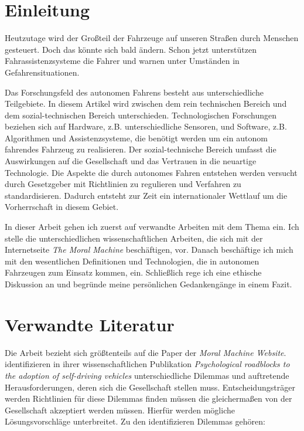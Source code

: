 \section{Einleitung}

Heutzutage wird der Großteil der Fahrzeuge auf unseren Straßen durch Menschen gesteuert. Doch das könnte sich bald ändern. Schon jetzt unterstützen Fahrassistenzsysteme die Fahrer und warnen unter Umständen in Gefahrensituationen.

Das Forschungsfeld des autonomen Fahrens besteht aus unterschiedliche Teilgebiete. In diesem Artikel wird  zwischen dem rein technischen Bereich und dem sozial-technischen Bereich unterschieden. Technologischen Forschungen beziehen sich auf Hardware, z.B. unterschiedliche Sensoren, und Software, z.B. Algorithmen und Assistenzsysteme, die benötigt werden um ein autonom fahrendes Fahrzeug zu realisieren. Der sozial-technische Bereich umfasst die Auswirkungen auf die Gesellschaft und das Vertrauen in die neuartige Technologie. Die Aspekte die durch autonomes Fahren entstehen werden versucht durch Gesetzgeber mit Richtlinien zu regulieren und Verfahren zu standardisieren. Dadurch entsteht zur Zeit ein internationaler Wettlauf um die Vorherrschaft in diesem Gebiet.

In dieser Arbeit gehen ich zuerst auf verwandte Arbeiten mit dem Thema ein. Ich stelle die unterschiedlichen wissenschaftlichen Arbeiten, die sich mit der Internetseite \textit{The Moral Machine} beschäftigen, vor. Danach beschäftige ich mich mit den wesentlichen Definitionen und Technologien, die in autonomen Fahrzeugen zum Einsatz kommen, ein. Schließlich rege ich eine ethische Diskussion an und begründe meine persönlichen Gedankengänge in einem Fazit.

\section{Verwandte Literatur}
Die Arbeit bezieht sich größtenteils auf die Paper der \textit{Moral Machine Website}. \citeauthor{roadblocks} identifizieren in ihrer wissenschaftlichen Publikation \textit{Psychological roadblocks to the adoption of self-driving vehicles} \cite{roadblocks} unterschiedliche Dilemmas und auftretende Herausforderungen, deren sich die Gesellschaft stellen muss. Entscheidungsträger werden Richtlinien für diese Dilemmas finden müssen die gleichermaßen von der Gesellschaft akzeptiert werden müssen. Hierfür werden mögliche Lösungsvorschläge unterbreitet.
Zu den identifizieren Dilemmas gehören:


